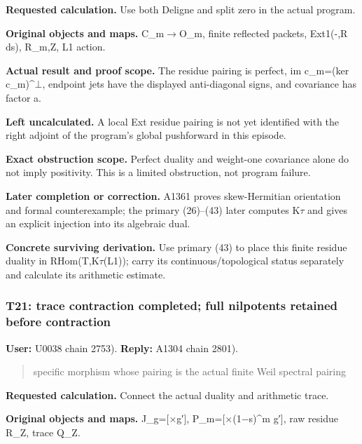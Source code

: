 \documentclass[10pt,a4paper,oneside]{report}
\begin{document}
\textbf{Requested calculation.} Use both Deligne and split zero in the
actual program.

\textbf{Original objects and maps.}
C\_m\allowbreak{}\ensuremath{→}\allowbreak{}O\_m, finite reflected
packets, Ext1(-,R ds), R\_m,Z, L1 action.

\textbf{Actual result and proof scope.} The residue pairing is perfect,
im c\_m=(ker
c\_m)\textasciicircum{}\allowbreak{}\ensuremath{⊥}\allowbreak{},
endpoint jets have the displayed anti-diagonal signs, and covariance has
factor a.

\textbf{Left uncalculated.} A local Ext residue pairing is not yet
identified with the right adjoint of the program's global pushforward in
this episode.

\textbf{Exact obstruction scope.} Perfect duality and weight-one
covariance alone do not imply positivity. This is a limited obstruction,
not program failure.

\textbf{Later completion or correction.} A1361 proves skew-Hermitian
orientation and formal counterexample; the primary (26)--(43) later
computes K\allowbreak{}\ensuremath{τ}\allowbreak{} and gives an explicit
injection into its algebraic dual.

\textbf{Concrete surviving derivation.} Use primary (43) to place this
finite residue duality in
RHom(T,K\allowbreak{}\ensuremath{τ}\allowbreak{}(L1)); carry its
continuous/topological status separately and calculate its arithmetic
estimate.

\subsubsection{T21: trace contraction completed; full nilpotents
retained before
contraction}\label{t21-trace-contraction-completed-full-nilpotents-retained-before-contraction}

\textbf{User:} U0038
\protect{} chain 2753).
\textbf{Reply:} A1304
\protect{} chain 2801).

\begin{quote}
specific morphism whose pairing is the actual finite Weil spectral
pairing
\end{quote}

\textbf{Requested calculation.} Connect the actual duality and
arithmetic trace.

\textbf{Original objects and maps.}
J\_g=[\allowbreak{}\ensuremath{×}\allowbreak{}g′],
P\_m=[\allowbreak{}\ensuremath{×}\allowbreak{}(1\allowbreak{}\ensuremath{−}\allowbreak{}s)\textasciicircum{}m
g′{]}, raw residue R\_Z, trace Q\_Z.
\end{document}
